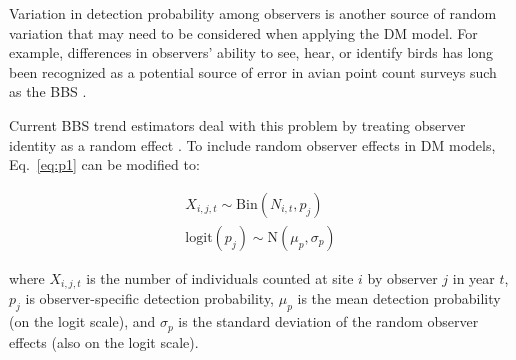 \documentclass[12pt,english]{article}
\begin{document}
\begin{spacing}{1.9}
\begin{flushleft}
Variation in detection probability among observers is another
source of random variation that may need to be considered when applying
the DM model. For example, differences in observers' ability to see,
hear, or identify birds has long been recognized as a potential source of error
in avian point count surveys such as the BBS 
\citep{robbins_etal:1986,sauer_etal:1994auk,campbell_francis:2011}.%

Current BBS trend estimators deal with this problem by
treating observer identity as a random %
effect \citep{link_sauer:2002,sauer_link:2011}.
%
To include random observer effects in DM models, 
Eq.~\ref{eq:p1} can be modified to:
\begin{linenomath*}
\begin{gather}
X_{i,j,t} \sim \mathrm{Bin}(N_{i,t}, p_j) \nonumber \\
\mathrm{logit}(p_j) \sim \mathrm{N}(\mu_p, \sigma_p)
\label{eq:pobs}
\end{gather}
\end{linenomath*}
where $X_{i,j,t}$ is the number of individuals counted at site $i$ by
observer $j$ in year $t$, $p_j$ is observer-specific detection probability,
$\mu_p$ is the mean detection probability (on the logit scale), and $\sigma_p$ is
the standard deviation of the random observer effects (also on the logit scale). 




\end{flushleft}
\end{spacing}
\end{document}
